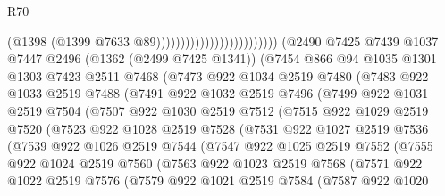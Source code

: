 \begin{lexlean}{R70}
\begin{coremodule}
                                                    (@1398 (@1399 @7633 @89)))))))))))))))))))))))))
      (@2490
        @7425
        @7439
        @1037
        @7447
        @2496
        (@1362 (@2499 @7425 @1341))
        (@7454
          @866
          @94
          @1035
          @1301
          @1303
          @7423
          @2511
          @7468
          (@7473
            @922
            @1034
            @2519
            @7480
            (@7483
              @922
              @1033
              @2519
              @7488
              (@7491
                @922
                @1032
                @2519
                @7496
                (@7499
                  @922
                  @1031
                  @2519
                  @7504
                  (@7507
                    @922
                    @1030
                    @2519
                    @7512
                    (@7515
                      @922
                      @1029
                      @2519
                      @7520
                      (@7523
                        @922
                        @1028
                        @2519
                        @7528
                        (@7531
                          @922
                          @1027
                          @2519
                          @7536
                          (@7539
                            @922
                            @1026
                            @2519
                            @7544
                            (@7547
                              @922
                              @1025
                              @2519
                              @7552
                              (@7555
                                @922
                                @1024
                                @2519
                                @7560
                                (@7563
                                  @922
                                  @1023
                                  @2519
                                  @7568
                                  (@7571
                                    @922
                                    @1022
                                    @2519
                                    @7576
                                    (@7579
                                      @922
                                      @1021
                                      @2519
                                      @7584
                                      (@7587
                                        @922
                                        @1020

\end{coremodule}
\end{lexlean}
